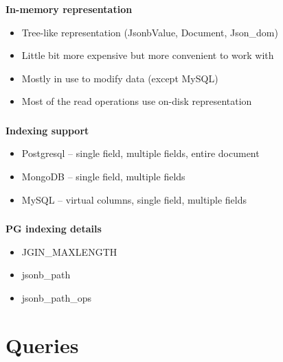 \documentclass[usenames,dvipsnames, 18pt, compress, aspectratio=169]{beamer}
\begin{document}
\begin{frame}
    \frametitle{}
    \textbf{In-memory representation}
    \begin{center}
        \begin{itemize}[label={\MVRightarrow}]
            \item Tree-like representation (JsonbValue, Document, Json\_dom)
            \item Little bit more expensive but more convenient to work with
            \item Mostly in use to modify data (except MySQL)
            \item Most of the read operations use on-disk representation
        \end{itemize}
    \end{center}
\end{frame}

\begin{frame}
    \frametitle{}
    \textbf{Indexing support}
    \begin{center}
        \begin{itemize}[label={\MVRightarrow}]
            \item Postgresql -- single field, multiple fields, entire document
            \item MongoDB -- single field, multiple fields
            \item MySQL -- virtual columns, single field, multiple fields
        \end{itemize}
    \end{center}
\end{frame}

\begin{frame}
    \frametitle{}
    \textbf{PG indexing details}
    \begin{center}
        \begin{itemize}[label={\MVRightarrow}]
            \item JGIN\_MAXLENGTH
            \item jsonb\_path
            \item jsonb\_path\_ops
        \end{itemize}
    \end{center}
\end{frame}

\fontsize{13pt}{14}\selectfont
\section{Queries}
\fontsize{17pt}{18}\selectfont
\end{document}
